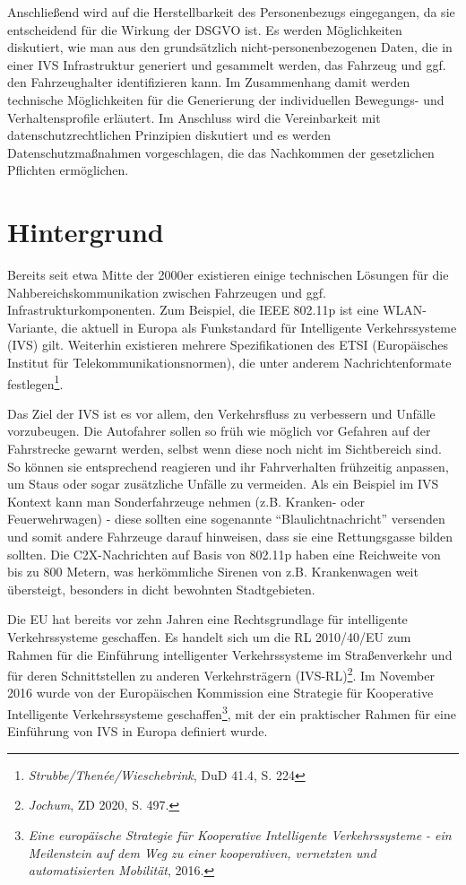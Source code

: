 Anschließend wird auf die Herstellbarkeit des Personenbezugs eingegangen, da sie entscheidend für die Wirkung der DSGVO ist. Es werden Möglichkeiten diskutiert, wie man aus den grundsätzlich nicht-personenbezogenen Daten, die in einer IVS Infrastruktur generiert und gesammelt werden, das Fahrzeug und ggf. den Fahrzeughalter identifizieren kann. Im Zusammenhang damit werden technische Möglichkeiten für die Generierung der individuellen Bewegungs- und Verhaltensprofile erläutert. Im Anschluss wird die Vereinbarkeit mit datenschutzrechtlichen Prinzipien diskutiert und es werden Datenschutzmaßnahmen vorgeschlagen, die das Nachkommen der gesetzlichen Pflichten ermöglichen.


\section{Hintergrund}
\label{ch:Background}

Bereits seit etwa Mitte der 2000er existieren einige technischen Lösungen für die Nahbereichskommunikation zwischen Fahrzeugen und ggf. Infrastrukturkomponenten. Zum Beispiel, die IEEE 802.11p ist eine WLAN-Variante, die aktuell in Europa als Funkstandard für Intelligente Verkehrssysteme (IVS) gilt. Weiterhin existieren mehrere Spezifikationen des ETSI (Europäisches Institut für Telekommunikationsnormen), die unter anderem Nachrichtenformate festlegen\footnote{\emph{Strubbe/Thenée/Wieschebrink}, DuD 41.4, S. 224}. \nocite{Strubbe2017}

Das Ziel der IVS ist es vor allem, den Verkehrsfluss zu verbessern und Unfälle vorzubeugen. Die Autofahrer sollen so früh wie möglich vor Gefahren auf der Fahrstrecke gewarnt werden, selbst wenn diese noch nicht im Sichtbereich sind. So können sie entsprechend reagieren und ihr Fahrverhalten frühzeitig anpassen, um Staus oder sogar zusätzliche Unfälle zu vermeiden. Als ein Beispiel im IVS Kontext kann man Sonderfahrzeuge nehmen (z.B. Kranken- oder Feuerwehrwagen) - diese sollten eine sogenannte ``Blaulichtnachricht''  versenden und somit andere Fahrzeuge darauf hinweisen, dass sie eine Rettungsgasse bilden sollten. Die C2X-Nachrichten auf Basis von 802.11p haben eine Reichweite von bis zu 800 Metern, was herkömmliche Sirenen von z.B. Krankenwagen weit übersteigt, besonders in dicht bewohnten Stadtgebieten.

Die EU hat bereits vor zehn Jahren eine Rechtsgrundlage für intelligente Verkehrssysteme geschaffen. Es handelt sich um die RL 2010/40/EU zum Rahmen für die Einführung intelligenter Verkehrssysteme im Straßenverkehr und für deren Schnittstellen zu anderen Verkehrsträgern (IVS-RL)\footnote{\emph{Jochum}, ZD 2020, S. 497.}. Im November 2016 wurde von der Europäischen Kommission eine Strategie für Kooperative Intelligente Verkehrssysteme geschaffen\footnote{\emph{Eine europäische Strategie für Kooperative Intelligente Verkehrssysteme - ein Meilenstein auf dem Weg zu einer kooperativen, vernetzten und automatisierten Mobilität}, 2016.}\nocite{CITS2016}, mit der ein praktischer Rahmen für eine Einführung von IVS in Europa definiert wurde. 

